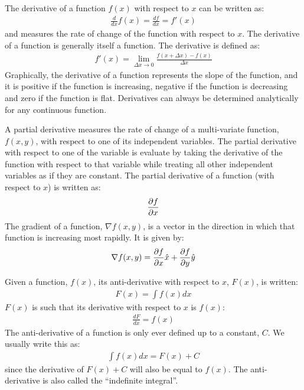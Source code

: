 \begin{chapterSummary}
The derivative of a function $f(x)$ with respect to $x$ can be written as:
\begin{align*}
\frac{d}{dx} f(x)=\frac{df}{dx}=f'(x)
\end{align*}
and measures the rate of change of the function with respect to $x$. The derivative of a function is generally itself a function. The derivative is defined as:
\begin{align*}
f'(x) = \lim_{\Delta x \to 0}\frac{f(x+\Delta x)-f(x)}{\Delta x}
\end{align*}
Graphically, the derivative of a function represents the slope of the function, and it is positive if the function is increasing, negative if the function is decreasing and zero if the function is flat.  Derivatives can always be determined analytically for any continuous function.

A partial derivative measures the rate of change of a multi-variate function, $f(x,y)$, with respect to one of its independent variables. The partial derivative with respect to one of the variable is evaluate by taking the derivative of the function with respect to that variable while treating all other independent variables as if they are constant. The partial derivative of a function (with respect to $x$) is written as:
\begin{align*}
\frac{\partial f}{\partial x}
\end{align*}
The gradient of a function, $\nabla f(x,y)$, is a vector in the direction in which that function is increasing most rapidly. It is given by:
\begin{align*}
\nabla f(x,y)=\frac{\partial f}{\partial x}\hat x + \frac{\partial f}{\partial y} \hat y
\end{align*}

Given a function, $f(x)$, its anti-derivative with respect to $x$, $F(x)$, is written:
\begin{align*}
F(x) = \int f(x) dx
\end{align*}
$F(x)$ is such that its derivative with respect to $x$ is $f(x)$:
\begin{align*}
\frac{dF}{dx}=f(x)
\end{align*}
The anti-derivative of a function is only ever defined up to a constant, $C$. We usually write this as:
\begin{align*}
\int f(x) dx = F(x) + C
\end{align*}
since the derivative of $F(x) +C$ will also be equal to $f(x)$. The anti-derivative is also called the ``indefinite integral''. 


\end{chapterSummary}
